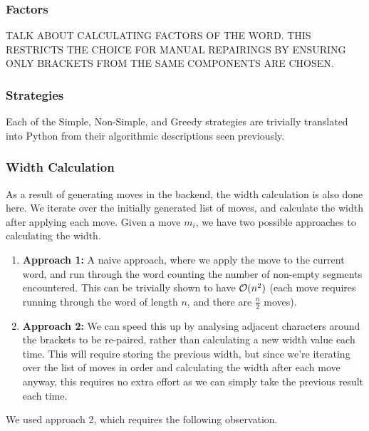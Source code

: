 
\subsubsection{Factors}
TALK ABOUT CALCULATING FACTORS OF THE WORD. THIS RESTRICTS THE CHOICE FOR MANUAL REPAIRINGS BY ENSURING ONLY BRACKETS FROM THE SAME COMPONENTS ARE CHOSEN.

\subsubsection{Strategies}
Each of the Simple, Non-Simple, and Greedy strategies are trivially translated into Python from their algorithmic descriptions seen previously.

\subsubsection{Width Calculation}
As a result of generating moves in the backend, the width calculation is also done here. We iterate over the initially generated list of moves, and calculate the width after applying each move. Given a move $m_{i}$, we have two possible approaches to calculating the width.
\begin{enumerate}
    \item \textbf{Approach 1:} A naive approach, where we apply the move to the current word, and run through the word counting the number of non-empty segments encountered. This can be trivially shown to have $\mathcal{O}(n^{2})$ (each move requires running through the word of length $n$, and there are $\frac{n}{2}$ moves).
    \item \textbf{Approach 2:} We can speed this up by analysing adjacent characters around the brackets to be re-paired, rather than calculating a new width value each time. This will require storing the previous width, but since we're iterating over the list of moves in order and calculating the width after each move anyway, this requires no extra effort as we can simply take the previous result each time.
\end{enumerate}
We used approach 2, which requires the following observation.

